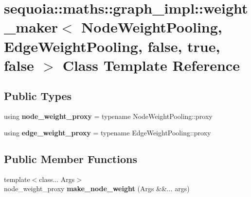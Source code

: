 \hypertarget{classsequoia_1_1maths_1_1graph__impl_1_1weight__maker_3_01_node_weight_pooling_00_01_edge_weight9e5a11aa4386c3e35769774740a56bd6}{}\section{sequoia\+::maths\+::graph\+\_\+impl\+::weight\+\_\+maker$<$ Node\+Weight\+Pooling, Edge\+Weight\+Pooling, false, true, false $>$ Class Template Reference}
\label{classsequoia_1_1maths_1_1graph__impl_1_1weight__maker_3_01_node_weight_pooling_00_01_edge_weight9e5a11aa4386c3e35769774740a56bd6}
\subsection*{Public Types}
\begin{DoxyCompactItemize}
\item 
\mbox{\label{classsequoia_1_1maths_1_1graph__impl_1_1weight__maker_3_01_node_weight_pooling_00_01_edge_weight9e5a11aa4386c3e35769774740a56bd6_a652dbfea4d9d9fcf7c85e2ad14126531}} 
using {\bfseries node\+\_\+weight\+\_\+proxy} = typename Node\+Weight\+Pooling\+::proxy
\item 
\mbox{\label{classsequoia_1_1maths_1_1graph__impl_1_1weight__maker_3_01_node_weight_pooling_00_01_edge_weight9e5a11aa4386c3e35769774740a56bd6_a8fc54df8e96fb9d8c7c1fc4e82e1e435}} 
using {\bfseries edge\+\_\+weight\+\_\+proxy} = typename Edge\+Weight\+Pooling\+::proxy
\end{DoxyCompactItemize}
\subsection*{Public Member Functions}
\begin{DoxyCompactItemize}
\item 
\mbox{\label{classsequoia_1_1maths_1_1graph__impl_1_1weight__maker_3_01_node_weight_pooling_00_01_edge_weight9e5a11aa4386c3e35769774740a56bd6_ab4aa8c99111ef90d51923f1083cf4576}} 
{\footnotesize template$<$class... Args$>$ }\\node\+\_\+weight\+\_\+proxy {\bfseries make\+\_\+node\+\_\+weight} (Args \&\&... args)
\end{DoxyCompactItemize}
